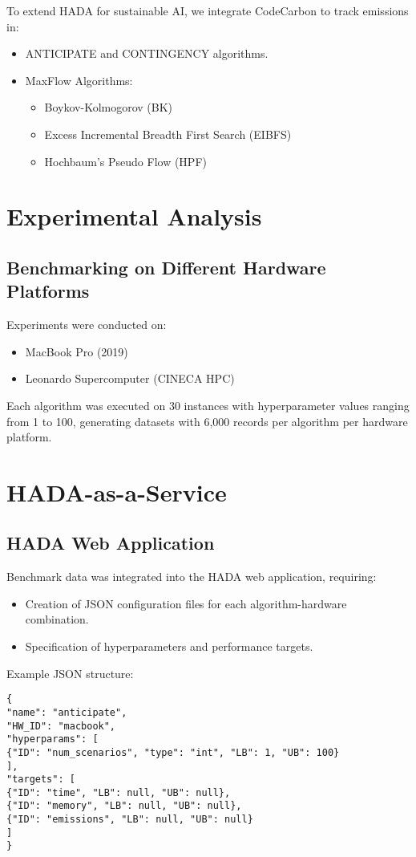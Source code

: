 \documentclass[a4paper,singleside,12pt]{report} %
\begin{document}
To extend HADA for sustainable AI, we integrate CodeCarbon to track emissions in:
\begin{itemize}
\item ANTICIPATE and CONTINGENCY algorithms.
\item MaxFlow Algorithms:
\begin{itemize}
\item Boykov-Kolmogorov (BK)
\item Excess Incremental Breadth First Search (EIBFS)
\item Hochbaum's Pseudo Flow (HPF)
\end{itemize}
\end{itemize}

\chapter{Experimental Analysis}

\section{Benchmarking on Different Hardware Platforms}
Experiments were conducted on:
\begin{itemize}
\item MacBook Pro (2019)
\item Leonardo Supercomputer (CINECA HPC)
\end{itemize}

Each algorithm was executed on 30 instances with hyperparameter values ranging from 1 to 100, 
generating datasets with 6,000 records per algorithm per hardware platform.

\chapter{HADA-as-a-Service}

\section{HADA Web Application}
Benchmark data was integrated into the HADA web application, requiring:
\begin{itemize}
\item Creation of JSON configuration files for each algorithm-hardware combination.
\item Specification of hyperparameters and performance targets.
\end{itemize}

Example JSON structure:
\begin{verbatim}
{
"name": "anticipate",
"HW_ID": "macbook",
"hyperparams": [
{"ID": "num_scenarios", "type": "int", "LB": 1, "UB": 100}
],
"targets": [
{"ID": "time", "LB": null, "UB": null},
{"ID": "memory", "LB": null, "UB": null},
{"ID": "emissions", "LB": null, "UB": null}
]
}
\end{verbatim}
\end{document}
